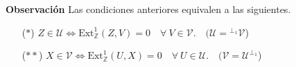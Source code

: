 \documentclass[preview]{standalone}
\begin{document}
\begin{center}
\justifying \textbf{Observación} Las condiciones anteriores equivalen a las siguientes.\begin{itemize} \item[($\ast$)] $Z\in\mathcal{U} \iff \text{Ext}^1_\mathbb{Z}(Z,V) = 0 \quad \forall \ V\in\mathcal{V}. \quad (\mathcal{U} = {}^{\perp_1}\mathcal{V}$) \item[($\ast\ast$)] $X\in\mathcal{V} \iff \text{Ext}^1_\mathbb{Z}(U,X) = 0 \quad \forall \ U\in\mathcal{U}. \quad (\mathcal{V} = \mathcal{U}^{\perp_1}$) \end{itemize}
\end{center}
\end{document}
